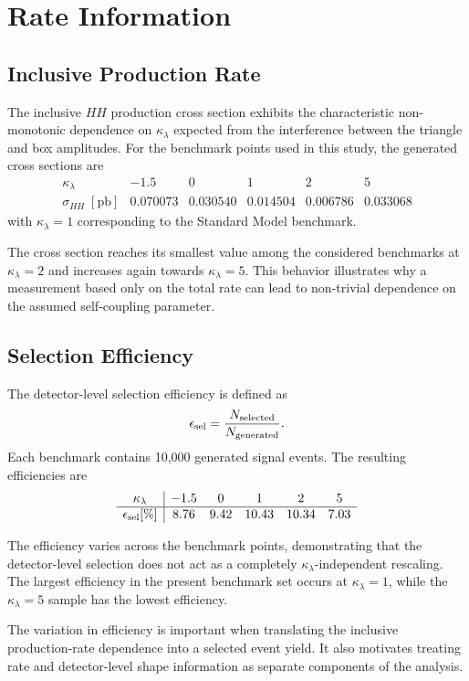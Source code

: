 \documentclass[11pt,a4paper]{article}
\begin{document}
\section{Rate Information}

\subsection{Inclusive Production Rate}

The inclusive $HH$ production cross section exhibits the characteristic non-monotonic dependence on $\kappa_\lambda$ expected from the interference between the triangle and box amplitudes. For the benchmark points used in this study, the generated cross sections are
\[
\begin{array}{c|ccccc}
\kappa_\lambda & -1.5 & 0 & 1 & 2 & 5\\
\hline
\sigma_{HH}\;[\mathrm{pb}]
&0.070073&0.030540&0.014504&0.006786&0.033068
\end{array}
\]
with $\kappa_\lambda=1$ corresponding to the Standard Model benchmark.

The cross section reaches its smallest value among the considered benchmarks at $\kappa_\lambda=2$ and increases again towards $\kappa_\lambda=5$. This behavior illustrates why a measurement based only on the total rate can lead to non-trivial dependence on the assumed self-coupling parameter.

\subsection{Selection Efficiency}

The detector-level selection efficiency is defined as
\[
\epsilon_{\rm sel}
=
\frac{N_{\rm selected}}{N_{\rm generated}}.
\]
Each benchmark contains 10,000 generated signal events. The resulting efficiencies are
\[
\begin{array}{c|ccccc}
\kappa_\lambda & -1.5 & 0 & 1 & 2 & 5\\
\hline
\epsilon_{\rm sel}[\%]
&8.76&9.42&10.43&10.34&7.03
\end{array}
\]

The efficiency varies across the benchmark points, demonstrating that the detector-level selection does not act as a completely $\kappa_\lambda$-independent rescaling. The largest efficiency in the present benchmark set occurs at $\kappa_\lambda=1$, while the $\kappa_\lambda=5$ sample has the lowest efficiency.

The variation in efficiency is important when translating the inclusive production-rate dependence into a selected event yield. It also motivates treating rate and detector-level shape information as separate components of the analysis.
\end{document}
